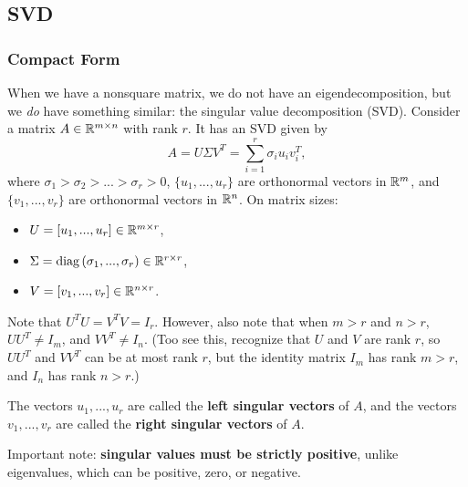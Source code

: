 \documentclass[12pt]{article}
\begin{document}
\subsection{SVD}

\subsubsection{Compact Form}
When we have a nonsquare matrix, we do not have an eigendecomposition, but we \textit{do} have something similar: the singular value decomposition (SVD). Consider a matrix $A \in { {\mathbb R}^{m \times n} }$ with rank $r$. It has an SVD given by
%
\begin{equation*}
A = U \Sigma V^T = \sum_{i=1}^r \sigma_i u_i v_i^T,
\end{equation*}
%
where $\sigma_1 > \sigma_2 > ... > \sigma_r > 0$, $\{u_1, ..., u_r\}$ are orthonormal vectors in ${ {\mathbb R}^{m} }$, and $\{v_1, ..., v_r\}$ are orthonormal vectors in ${ {\mathbb R}^{n} }$. On matrix sizes:
%
\begin{itemize}
\item $U = [u_1, ..., u_r] \in { {\mathbb R}^{m \times r} }$, 
\item $\Sigma = \mathrm{diag}\left({\sigma_1, ..., \sigma_r}\right) \in { {\mathbb R}^{r \times r} }$,
\item $V = [v_1, ..., v_r] \in { {\mathbb R}^{n \times r} }$.
\end{itemize}
%
Note that $U^T U = V^T V = I_r$. However, also note that when $m > r$ and $n > r$, $UU^T \neq I_{m}$, and $VV^T \neq I_n$. (Too see this, recognize that $U$ and $V$ are rank $r$, so $UU^T$ and $VV^T$ can be at most rank $r$, but the identity matrix $I_m$ has rank $m >r$, and $I_n$ has rank $n > r$.)

The vectors $u_1, ..., u_r$ are called the \textbf{left singular vectors} of $A$, and the vectors $v_1, ..., v_r$ are called the \textbf{right singular vectors} of $A$. 

Important note: \textbf{singular values must be strictly positive}, unlike eigenvalues, which can be positive, zero, or negative. 
\end{document}
